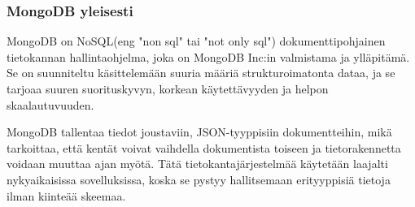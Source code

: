 






\subsubsection{MongoDB yleisesti}









MongoDB on NoSQL(eng "non sql"{} tai "not only sql"{}) dokumenttipohjainen tietokannan hallintaohjelma, joka on MongoDB Inc:in valmistama ja ylläpitämä.
Se on suunniteltu käsittelemään suuria määriä strukturoimatonta dataa, ja se tarjoaa suuren suorituskyvyn, korkean käytettävyyden ja helpon skaalautuvuuden.
\medskip

MongoDB tallentaa tiedot joustaviin, JSON-tyyppisiin dokumentteihin, mikä tarkoittaa, että kentät voivat vaihdella dokumentista toiseen ja tietorakennetta voidaan muuttaa ajan myötä.
Tätä tietokantajärjestelmää käytetään laajalti nykyaikaisissa sovelluksissa, koska se pystyy hallitsemaan erityyppisiä tietoja ilman kiinteää skeemaa.
\medskip



